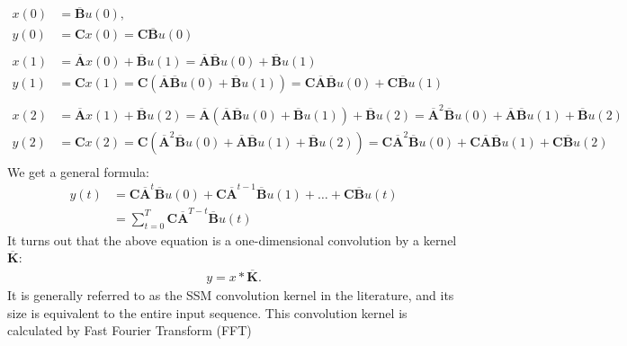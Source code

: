 \begin{align*}
	x(0) &= \overline{\mathbf{B}}u(0),\\
	y(0) &= \mathbf{C}x(0) = \mathbf{C}\overline{\mathbf{B}}u(0)\\
		 &\\
	x(1) &= \overline{\mathbf{A}}x(0)+\overline{\mathbf{B}}u(1)=\overline{\mathbf{A}}\overline{\mathbf{B}}u(0)+\overline{\mathbf{B}}u(1)\\
	y(1) &= \mathbf{C}x(1) = \mathbf{C}(\overline{\mathbf{A}}\overline{\mathbf{B}}u(0)+\overline{\mathbf{B}}u(1)) = \mathbf{C}\overline{\mathbf{A}}\overline{\mathbf{B}}u(0)+\mathbf{C}\overline{\mathbf{B}}u(1)\\
		 &\\
	x(2) &= \overline{\mathbf{A}}x(1)+\overline{\mathbf{B}}u(2)=\overline{\mathbf{A}}(\overline{\mathbf{A}}\overline{\mathbf{B}}u(0)+\overline{\mathbf{B}}u(1))+\overline{\mathbf{B}}u(2)=\overline{\mathbf{A}}^2\overline{\mathbf{B}}u(0)+\overline{\mathbf{A}}\overline{\mathbf{B}}u(1)+\overline{\mathbf{B}}u(2)\\
	y(2) &= \mathbf{C}x(2)=\mathbf{C}(\overline{\mathbf{A}}^2\overline{\mathbf{B}}u(0)+\overline{\mathbf{A}}\overline{\mathbf{B}}u(1)+\overline{\mathbf{B}}u(2))=\mathbf{C}\overline{\mathbf{A}}^2\overline{\mathbf{B}}u(0)+\mathbf{C}\overline{\mathbf{A}}\overline{\mathbf{B}}u(1)+\mathbf{C}\overline{\mathbf{B}}u(2)\\
\end{align*}
We get a general formula:
\begin{align*}
	y(t) &= \mathbf{C}\overline{\mathbf{A}}^t\overline{\mathbf{B}}u(0)+\mathbf{C}\overline{\mathbf{A}}^{t-1}\overline{\mathbf{B}}u(1)+\dots+\mathbf{C}\overline{\mathbf{B}}u(t)\\
		 &= \sum_{t=0}^T \mathbf{C}\overline{\mathbf{A}}^{T-t}\overline{\mathbf{B}}u(t)
\end{align*}
It turns out that the above equation is a one-dimensional convolution by a kernel $\overline{\mathbf{K}}$:
\begin{align*}
	y = x*\overline{\mathbf{K}}.
\end{align*}
It is generally referred to as the SSM convolution kernel in the literature, and its size is equivalent to the entire input sequence. This convolution kernel is calculated by Fast Fourier Transform (FFT)

